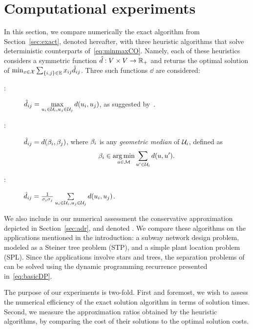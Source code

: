 \documentclass[12pt]{article}
\DeclareMathOperator*{\argmin}{arg\,min}
\begin{document}
\section{Computational experiments}
\label{sec:num}

In this section, we compare numerically the exact algorithm from Section~\ref{sec:exact}, denoted \exact{} hereafter, with three heuristic algorithms that solve deterministic counterparts of~\ref{eq:minmaxCO}. Namely, each of these heuristics considers a symmetric function $\hat{d}:V\times V\rightarrow\mathbb{R}_+$ and returns the optimal solution of $\min_{x\in \mathcal{X}}\sum_{\{i,j\}\in \mathbb{E}} x_{ij}\hat{d}_{ij}$. Three such functions $\dd$ are considered:
\begin{description}
 \item[\worst{}:] $\hat{d}_{ij}=\max\limits_{u_i\in \mathcal{U}_i, u_j\in \mathcal{U}_j} d(u_i,u_j)$, as suggested by~\cite{citovsky2017tsp}.
 \item[\hcenter{}:] $\hat{d}_{ij}=d(\beta_i,\beta_j)$, where $\beta_i$ is any \emph{geometric median} of $\mathcal{U}_i$, defined as $$\bc_i\in\argmin\limits_{u\in\Metric}\sum\limits_{u'\in \U_i}\dist{u}{u'}.$$
 \item[\avg{}:] $\hat{d}_{ij}=\frac{1}{{\sigma_{i}}{\sigma_{j}}}\sum\limits_{u_i\in\mathcal{U}_i,u_j\in\mathcal{U}_j}d(u_i,u_j)$.
\end{description}
We also include in our numerical assessment the conservative approximation depicted in Section~\ref{sec:adr}, and denoted \cons{}. We compare these algorithms on the applications mentioned in the introduction: a subway network design problem, modeled as a Steiner tree problem (STP), and a simple plant location problem (SPL). 
Since the applications involve stars and trees, the separation problems of \exact{} can be solved using the dynamic programming recurrence presented in~\eqref{eq:basicDP}.

The purpose of our experiments is two-fold. First and foremost, we wish to assess the numerical efficiency of the exact solution algorithm in terms of solution times. Second, we measure the approximation ratios obtained by the heuristic algorithms, by comparing the cost of their solutions to the optimal solution costs.
\end{document}

